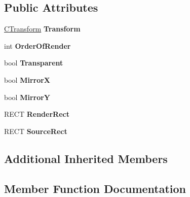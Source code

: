 \subsection*{Public Attributes}
\begin{DoxyCompactItemize}
\item 
\hyperlink{class_c_transform}{C\+Transform} {\bfseries Transform}\hypertarget{class_c_sprite_renderer_ada57cb75acff5d13c87d4175ad8365dc}{}\label{class_c_sprite_renderer_ada57cb75acff5d13c87d4175ad8365dc}

\item 
int {\bfseries Order\+Of\+Render}\hypertarget{class_c_sprite_renderer_a7f5f8d13db54319d40a6365456534b31}{}\label{class_c_sprite_renderer_a7f5f8d13db54319d40a6365456534b31}

\item 
bool {\bfseries Transparent}\hypertarget{class_c_sprite_renderer_ac9af3336259b723afa0bbf656229fa90}{}\label{class_c_sprite_renderer_ac9af3336259b723afa0bbf656229fa90}

\item 
bool {\bfseries MirrorX}\hypertarget{class_c_sprite_renderer_ad32bb91df9e17d69298dd671a77b47a3}{}\label{class_c_sprite_renderer_ad32bb91df9e17d69298dd671a77b47a3}

\item 
bool {\bfseries MirrorY}\hypertarget{class_c_sprite_renderer_a2eb0afe3eac443d75f511eda8c80a1ef}{}\label{class_c_sprite_renderer_a2eb0afe3eac443d75f511eda8c80a1ef}

\item 
R\+E\+CT {\bfseries Render\+Rect}\hypertarget{class_c_sprite_renderer_ad061b59c18480492e87432b1b7578d0a}{}\label{class_c_sprite_renderer_ad061b59c18480492e87432b1b7578d0a}

\item 
R\+E\+CT {\bfseries Source\+Rect}\hypertarget{class_c_sprite_renderer_a540fe6fcd0ff6266902249ed4f43f05c}{}\label{class_c_sprite_renderer_a540fe6fcd0ff6266902249ed4f43f05c}

\end{DoxyCompactItemize}
\subsection*{Additional Inherited Members}


\subsection{Member Function Documentation}
